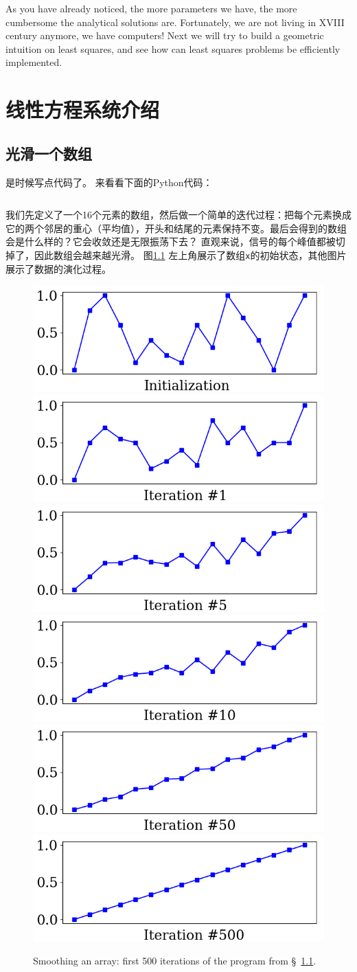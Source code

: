 \documentclass[notitlepage,oneside]{book}
\makeatletter
\newcommand{\authoredby}[1]{\addtocontents{toc}{\protect\@nameuse{authoredby#1}}}%
\makeatother
\begin{document}
As you have already noticed, the more parameters we have, the more cumbersome the analytical solutions are.
Fortunately, we are not living in XVIII century anymore, we have computers!
Next we will try to build a geometric intuition on least squares, and see how can least squares problems be efficiently implemented.


\authoredby{B}
\chapter{线性方程系统介绍}
\fancyhead[R]{\textcolor{ao(english)}{core text}}
\label{ch:linsyst}

\section{光滑一个数组}
\label{sec:arraysmooth}
是时候写点代码了。 来看看下面的Python代码：
\inputminted[frame=single,linenos=true]{python}{listings/example_3.1.py}
我们先定义了一个16个元素的数组，然后做一个简单的迭代过程：把每个元素换成它的两个邻居的重心（平均值），开头和结尾的元素保持不变。最后会得到的数组会是什么样的？它会收敛还是无限振荡下去？
直观来说，信号的每个峰值都被切掉了，因此数组会越来越光滑。
图\ref{fig:linsys_smooth} 左上角展示了数组\texttt{x}的初始状态，其他图片展示了数据的演化过程。

\begin{figure}[ht]
    \centering
    \includegraphics[width=.32\linewidth]{img/example_3_1_0.png}
    \includegraphics[width=.32\linewidth]{img/example_3_1_1.png}
    \includegraphics[width=.32\linewidth]{img/example_3_1_2.png}
    \includegraphics[width=.32\linewidth]{img/example_3_1_3.png}
    \includegraphics[width=.32\linewidth]{img/example_3_1_4.png}
    \includegraphics[width=.32\linewidth]{img/example_3_1_5.png}
\caption{Smoothing an array: first 500 iterations of the program from \S~\ref{sec:arraysmooth}.}
    \label{fig:linsys_smooth}
\end{figure}
\end{document}
